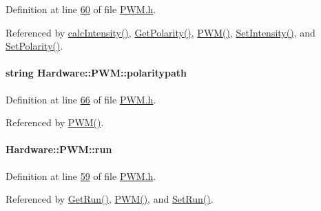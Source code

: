 Definition at line \hyperlink{_p_w_m_8h_source_l00060}{60} of file \hyperlink{_p_w_m_8h_source}{P\+W\+M.\+h}.



Referenced by \hyperlink{_p_w_m_8cpp_source_l00070}{calc\+Intensity()}, \hyperlink{_p_w_m_8h_source_l00048}{Get\+Polarity()}, \hyperlink{_p_w_m_8cpp_source_l00015}{P\+W\+M()}, \hyperlink{_p_w_m_8cpp_source_l00090}{Set\+Intensity()}, and \hyperlink{_p_w_m_8cpp_source_l00149}{Set\+Polarity()}.

\hypertarget{class_hardware_1_1_p_w_m_ace89c96484ffa9d6c9f3a8067848bf51}{}
\paragraph[{polaritypath}]{\setlength{\rightskip}{0pt plus 5cm}string Hardware\+::\+P\+W\+M\+::polaritypath\hspace{0.3cm}{\ttfamily [private]}}\label{class_hardware_1_1_p_w_m_ace89c96484ffa9d6c9f3a8067848bf51}


Definition at line \hyperlink{_p_w_m_8h_source_l00066}{66} of file \hyperlink{_p_w_m_8h_source}{P\+W\+M.\+h}.



Referenced by \hyperlink{_p_w_m_8cpp_source_l00015}{P\+W\+M()}.

\hypertarget{class_hardware_1_1_p_w_m_a04531646b41accced24d46046c4bc7de}{}
\paragraph[{run}]{ Hardware\+::\+P\+W\+M\+::run\hspace{0.3cm}{\ttfamily [private]}}\label{class_hardware_1_1_p_w_m_a04531646b41accced24d46046c4bc7de}


Definition at line \hyperlink{_p_w_m_8h_source_l00059}{59} of file \hyperlink{_p_w_m_8h_source}{P\+W\+M.\+h}.



Referenced by \hyperlink{_p_w_m_8h_source_l00045}{Get\+Run()}, \hyperlink{_p_w_m_8cpp_source_l00015}{P\+W\+M()}, and \hyperlink{_p_w_m_8cpp_source_l00138}{Set\+Run()}.

\hypertarget{class_hardware_1_1_p_w_m_ac1eb93467481ee2bd3565f1be47b8a01}{}
